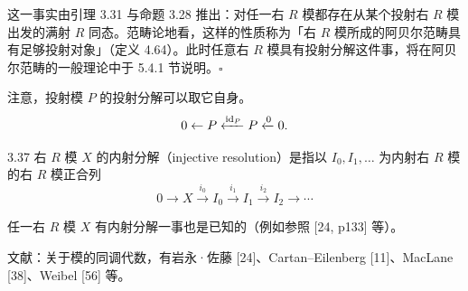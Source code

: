 这一事实由引理 3.31 与命题 3.28 推出：对任一右 $R$ 模都存在从某个投射右 $R$ 模出发的满射 $R$ 同态。范畴论地看，这样的性质称为「右 $R$ 模所成的阿贝尔范畴具有足够投射对象」（定义 4.64）。此时任意右 $R$ 模具有投射分解这件事，将在阿贝尔范畴的一般理论中于 5.4.1 节说明。\hfill$\square$


注意，投射模 $P$ 的投射分解可以取它自身。
\[
0\leftarrow P\xleftarrow{\mathrm{id}_P}P\xleftarrow{0}0.
\]

\begin{definition}{3.37}
右 $R$ 模 $X$ 的内射分解（injective resolution）是指以 $I_0,I_1,\ldots$ 为内射右 $R$ 模的右 $R$ 模正合列
\[
0\to X\xrightarrow{i_0}I_0\xrightarrow{i_1}I_1\xrightarrow{i_2}I_2\to\cdots
\]
\end{definition}


任一右 $R$ 模 $X$ 有内射分解一事也是已知的（例如参照 [24, p133] 等）。

文献：关于模的同调代数，有岩永·佐藤 [24]、Cartan–Eilenberg [11]、MacLane [38]、Weibel [56] 等。
